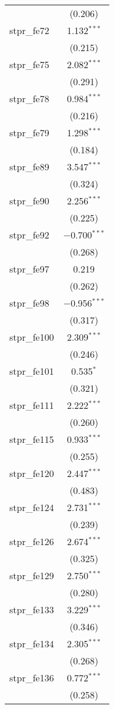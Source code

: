 \begin{table}[!htbp]
\begin{tabular}{@{\extracolsep{5pt}}lc}
  & (0.206) \\ 
  stpr\_fe72 & 1.132$^{***}$ \\ 
  & (0.215) \\ 
  stpr\_fe75 & 2.082$^{***}$ \\ 
  & (0.291) \\ 
  stpr\_fe78 & 0.984$^{***}$ \\ 
  & (0.216) \\ 
  stpr\_fe79 & 1.298$^{***}$ \\ 
  & (0.184) \\ 
  stpr\_fe89 & 3.547$^{***}$ \\ 
  & (0.324) \\ 
  stpr\_fe90 & 2.256$^{***}$ \\ 
  & (0.225) \\ 
  stpr\_fe92 & $-$0.700$^{***}$ \\ 
  & (0.268) \\ 
  stpr\_fe97 & 0.219 \\ 
  & (0.262) \\ 
  stpr\_fe98 & $-$0.956$^{***}$ \\ 
  & (0.317) \\ 
  stpr\_fe100 & 2.309$^{***}$ \\ 
  & (0.246) \\ 
  stpr\_fe101 & 0.535$^{*}$ \\ 
  & (0.321) \\ 
  stpr\_fe111 & 2.222$^{***}$ \\ 
  & (0.260) \\ 
  stpr\_fe115 & 0.933$^{***}$ \\ 
  & (0.255) \\ 
  stpr\_fe120 & 2.447$^{***}$ \\ 
  & (0.483) \\ 
  stpr\_fe124 & 2.731$^{***}$ \\ 
  & (0.239) \\ 
  stpr\_fe126 & 2.674$^{***}$ \\ 
  & (0.325) \\ 
  stpr\_fe129 & 2.750$^{***}$ \\ 
  & (0.280) \\ 
  stpr\_fe133 & 3.229$^{***}$ \\ 
  & (0.346) \\ 
  stpr\_fe134 & 2.305$^{***}$ \\ 
  & (0.268) \\ 
  stpr\_fe136 & 0.772$^{***}$ \\ 
  & (0.258) \\ 

\end{tabular}
\end{table}
